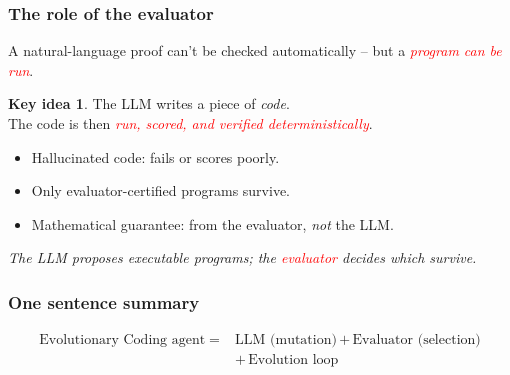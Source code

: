 \documentclass{beamer}
\theoremstyle{definition}
\newtheorem*{KeyIdea}{Key idea}
\newcommand\remph[1]{\emph{\textcolor{red}{#1}}}
\begin{document}

\begin{frame}
  \frametitle{The role of the evaluator}
  A natural-language proof can't be checked automatically -- but a
  \remph{program can be run}.
  \pause
  \vspace{.25cm}

  \begin{KeyIdea}
    The LLM writes a piece of \emph{code}. \\
    The code is then \remph{run, scored, and verified deterministically}.
  \end{KeyIdea}
  \pause
  \vspace{.25cm}

  \begin{itemize}
    \item[$\bullet$] Hallucinated code: fails or scores poorly.
      \pause
    \item[$\bullet$] Only evaluator-certified programs survive.
      \pause
    \item[$\bullet$] Mathematical guarantee: from the evaluator,
      \emph{not} the LLM.
  \end{itemize}
  \pause
  \vspace{.25cm}

  \begin{center}
    \emph{The LLM proposes executable programs; the \remph{evaluator} decides
      which survive.}
  \end{center}
\end{frame}


\begin{frame}
  \frametitle{One sentence summary}
  \pause
  \begin{center}
    \[
      \boxed{\;
        \begin{aligned}
          \text{Evolutionary Coding agent} \;=\; & \text{LLM (mutation)} \,+\, \text{Evaluator (selection)} \\
          & {} +\, \text{Evolution loop}
        \end{aligned}
      \;}
    \]
  \end{center}

\end{frame}

\end{document}
